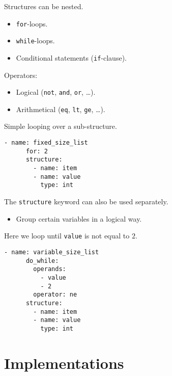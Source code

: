 \documentclass[slidestop]{beamer}
\begin{document}
\begin{pframe}
  Structures can be nested.
  \begin{itemize}
    \item \lstinline{for}-loops.
    \item \lstinline{while}-loops.
    \item Conditional statements (\lstinline{if}-clause).
  \end{itemize}
  \bigskip

  Operators:
  \begin{itemize}
    \item Logical (\lstinline{not}, \lstinline{and}, \lstinline{or}, \ldots).
    \item Arithmetical (\lstinline{eq}, \lstinline{lt}, \lstinline{ge},
      \ldots).
  \end{itemize}
\end{pframe}

\begin{pframe}
  Simple looping over a sub-structure.
  \begin{lstlisting}[language=none, caption={Simple for-loop.}]
    - name: fixed_size_list
      for: 2
      structure:
        - name: item
        - name: value
          type: int
  \end{lstlisting}

  The \lstinline{structure} keyword can also be used separately.
  \begin{itemize}
    \item Group certain variables in a logical way.
  \end{itemize}
\end{pframe}

\begin{pframe}
  Here we loop until \lstinline{value} is not equal to $2$.
  \begin{lstlisting}[language=none, caption={More complicated do-while-loop.}]
    - name: variable_size_list
      do_while:
        operands:
          - value
          - 2
        operator: ne
      structure:
        - name: item
        - name: value
          type: int
  \end{lstlisting}
\end{pframe}

\section{Implementations}
\end{document}

